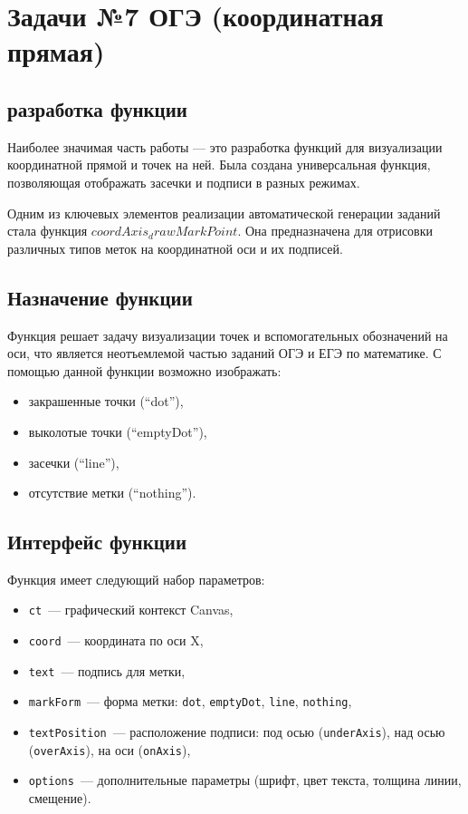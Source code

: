 \section{Задачи №7 ОГЭ (координатная прямая)}

\subsection{разработка функции}
Наиболее значимая часть работы — это разработка функций для визуализации координатной прямой и точек на ней. 
Была создана универсальная функция, позволяющая отображать засечки и подписи в разных режимах.

Одним из ключевых элементов реализации автоматической генерации заданий стала функция $coordAxis_drawMarkPoint$. Она предназначена для отрисовки различных типов меток на координатной оси и их подписей.

\subsection{Назначение функции}
Функция решает задачу визуализации точек и вспомогательных обозначений на оси,
что является неотъемлемой частью заданий ОГЭ и ЕГЭ по математике.
С помощью данной функции возможно изображать:
\begin{itemize}
    \item закрашенные точки (``dot''),
    \item выколотые точки (``emptyDot''),
    \item засечки (``line''),
    \item отсутствие метки (``nothing'').
\end{itemize}
 

\subsection{Интерфейс функции}
Функция имеет следующий набор параметров:
\begin{itemize}
    \item \texttt{ct}~--- графический контекст Canvas,
    \item \texttt{coord}~--- координата по оси X,
    \item \texttt{text}~--- подпись для метки,
    \item \texttt{markForm}~--- форма метки: \texttt{dot}, \texttt{emptyDot}, \texttt{line}, \texttt{nothing},
    \item \texttt{textPosition}~--- расположение подписи: под осью (\texttt{underAxis}), над осью (\texttt{overAxis}), на оси (\texttt{onAxis}),
    \item \texttt{options}~--- дополнительные параметры (шрифт, цвет текста, толщина линии, смещение).
\end{itemize}

